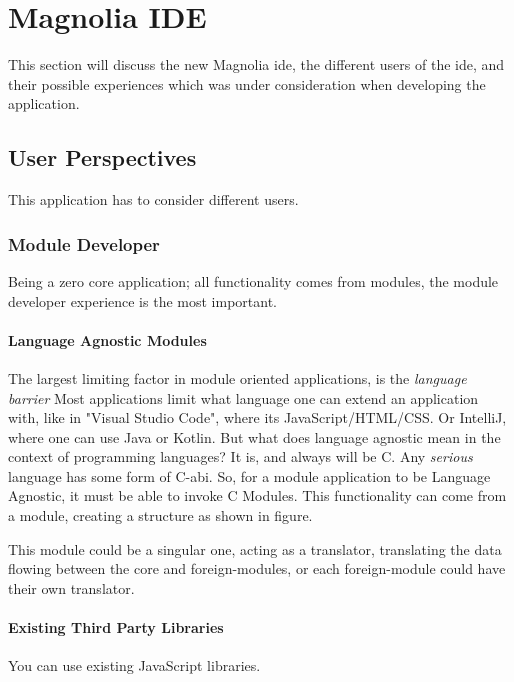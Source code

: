 \chapter{Magnolia IDE} \label{cha:ide}

This section will discuss the new Magnolia \gls{ide}, the different users of the
\gls{ide}, and their possible experiences which was under consideration when
developing the application.

\section{User Perspectives}

This application has to consider different users.

\subsection{Module Developer}

Being a zero core application; all functionality comes from modules, the module
developer experience is the most important.

\subsubsection{Language Agnostic Modules}

The largest limiting factor in module oriented applications, is the
\textit{language barrier} Most applications limit what language one can extend
an application with, like in "Visual Studio Code", where its
JavaScript/HTML/CSS. Or IntelliJ, where one can use Java or Kotlin. But what
does language agnostic mean in the context of programming languages? It is, and
always will be C. Any \textit{serious} language has some form of C-\gls{abi}.
So, for a module application to be Language Agnostic, it must be able to invoke
C Modules. This functionality can come from a module, creating a structure as
shown in figure. 

This module could be a singular one, acting as a translator, translating the
data flowing between the core and foreign-modules, or each foreign-module could
have their own translator.

\subsubsection{Existing Third Party Libraries}

You can use existing JavaScript libraries.

